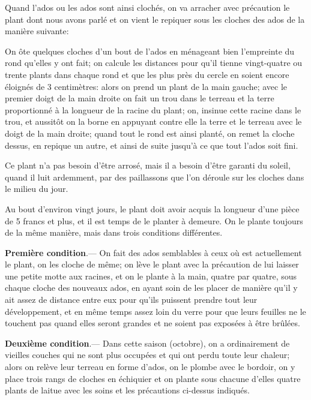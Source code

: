 \documentclass[10pt,a4paper]{book}
\begin{document}
Quand l'ados ou les ados sont ainsi clochés, on va arracher avec précaution le plant dont nous avons parlé et on vient le repiquer sous les cloches des ados de la manière suivante:

On ôte quelques cloches d'un bout de l'ados en ménageant bien l'empreinte du rond qu'elles y ont fait; on calcule les distances pour qu'il tienne vingt-quatre ou trente plants dans chaque rond et que les plus près du cercle en soient encore éloignés de 3 centimètres: alors on prend un plant de la main gauche; avec le premier doigt de la main droite on fait un trou dans le terreau et la terre proportionné à la longueur de la racine du plant; on, insinue cette racine dans le trou, et aussitôt on la borne en appuyant contre elle la terre et le terreau avec le doigt de la main droite; quand tout le rond est ainsi planté, on remet la cloche dessus, en repique un autre, et ainsi de suite jusqu'à ce que tout l'ados soit fini.

Ce plant n'a pas besoin d'être arrosé, mais il a besoin d'être garanti du soleil, quand il luit ardemment, par des paillassons que l'on déroule sur les cloches dans le milieu du jour.

Au bout d'environ vingt jours, le plant doit avoir acquis la longueur d'une pièce de 5 francs et plus, et il est temps de le planter à demeure. On le plante toujours de la même manière, mais dans trois conditions différentes.

\textbf{Première condition}.--- On fait des ados semblables à ceux où est actuellement le plant, on les cloche de même; on lève le plant avec la précaution de lui laisser une petite motte aux racines, et on le plante à la main, quatre par quatre, sous chaque cloche des nouveaux ados, en ayant soin de les placer de manière qu'il y ait assez de distance entre eux pour qu'ils puissent prendre tout leur développement, et en même temps assez loin du verre pour que leurs feuilles ne le touchent pas quand elles seront grandes et ne soient pas exposées à être brûlées.

\textbf{Deuxième condition}.--- Dans cette saison (octobre), on a ordinairement de vieilles couches qui ne sont plus occupées et qui ont perdu toute leur chaleur; alors on relève leur terreau en forme d'ados, on le plombe avec le bordoir, on y place trois rangs de cloches en échiquier et on plante sous chacune d'elles quatre plants de laitue avec les soins et les précautions ci-dessus indiqués.
\end{document}
